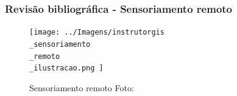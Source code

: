 \documentclass{beamer}
\begin{document}
\begin{frame}
    \frametitle{Revisão bibliográfica - Sensoriamento remoto}
    \begin{figure}[!ht]
        \centering
        \texttt{[image: 
            ../Imagens/instrutorgis\\\_sensoriamento\\\_remoto\\\_ilustracao.png
        ]}
        \caption{Sensoriamento remoto Foto:\cite{InstrutorGIS}}
    \label{fig:sensoriamento}
    \end{figure}
    \end{frame}
\end{document}

